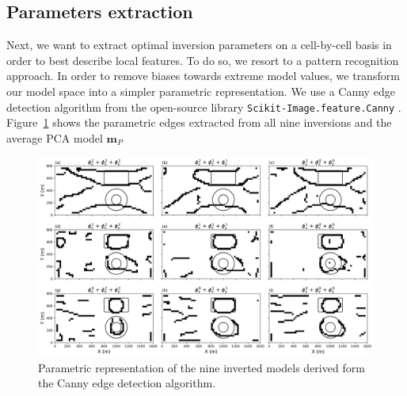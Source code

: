 \documentclass[extra,referee]{gji}
\begin{document}
\subsection{Parameters extraction}
Next, we want to extract optimal inversion parameters on a cell-by-cell basis in order to best describe local features. To do so, we resort to a pattern recognition approach. In order to remove biases towards extreme model values, we transform our model space into a simpler parametric representation. We use a Canny edge detection algorithm from the open-source library \texttt{Scikit-Image.feature.Canny} \cite[]{Pedregosa2011}.
Figure~\ref{CannyEdges} shows the parametric edges extracted from all nine inversions and the average PCA model $\mathbf{m}_P$
\begin{figure}
\includegraphics[width=\columnwidth]{Figures/Tomo2D_CannyModels.png}
\caption{Parametric representation of the nine inverted models derived form the Canny edge detection algorithm.}
\label{CannyEdges}
\end{figure}
\end{document}

